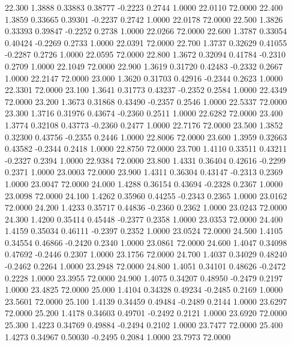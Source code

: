   22.300   1.3888   0.33883   0.38777  -0.2223   0.2744   1.0000  22.0110  72.0000
  22.400   1.3859   0.33665   0.39301  -0.2237   0.2742   1.0000  22.0178  72.0000
  22.500   1.3826   0.33393   0.39847  -0.2252   0.2738   1.0000  22.0266  72.0000
  22.600   1.3787   0.33054   0.40424  -0.2269   0.2733   1.0000  22.0391  72.0000
  22.700   1.3737   0.32629   0.41055  -0.2287   0.2726   1.0000  22.0595  72.0000
  22.800   1.3672   0.32094   0.41784  -0.2310   0.2709   1.0000  22.1049  72.0000
  22.900   1.3619   0.31720   0.42483  -0.2332   0.2667   1.0000  22.2147  72.0000
  23.000   1.3620   0.31703   0.42916  -0.2344   0.2623   1.0000  22.3301  72.0000
  23.100   1.3641   0.31773   0.43237  -0.2352   0.2584   1.0000  22.4349  72.0000
  23.200   1.3673   0.31868   0.43490  -0.2357   0.2546   1.0000  22.5337  72.0000
  23.300   1.3716   0.31976   0.43674  -0.2360   0.2511   1.0000  22.6282  72.0000
  23.400   1.3774   0.32108   0.43773  -0.2360   0.2477   1.0000  22.7176  72.0000
  23.500   1.3852   0.32300   0.43756  -0.2355   0.2446   1.0000  22.8006  72.0000
  23.600   1.3959   0.32663   0.43582  -0.2344   0.2418   1.0000  22.8750  72.0000
  23.700   1.4110   0.33511   0.43211  -0.2327   0.2394   1.0000  22.9384  72.0000
  23.800   1.4331   0.36404   0.42616  -0.2299   0.2371   1.0000  23.0003  72.0000
  23.900   1.4311   0.36304   0.43147  -0.2313   0.2369   1.0000  23.0047  72.0000
  24.000   1.4288   0.36154   0.43694  -0.2328   0.2367   1.0000  23.0098  72.0000
  24.100   1.4262   0.35960   0.44255  -0.2343   0.2365   1.0000  23.0162  72.0000
  24.200   1.4233   0.35717   0.44836  -0.2360   0.2362   1.0000  23.0243  72.0000
  24.300   1.4200   0.35414   0.45448  -0.2377   0.2358   1.0000  23.0353  72.0000
  24.400   1.4159   0.35034   0.46111  -0.2397   0.2352   1.0000  23.0524  72.0000
  24.500   1.4105   0.34554   0.46866  -0.2420   0.2340   1.0000  23.0861  72.0000
  24.600   1.4047   0.34098   0.47692  -0.2446   0.2307   1.0000  23.1756  72.0000
  24.700   1.4037   0.34029   0.48240  -0.2462   0.2264   1.0000  23.2948  72.0000
  24.800   1.4051   0.34101   0.48626  -0.2472   0.2228   1.0000  23.3955  72.0000
  24.900   1.4075   0.34207   0.48950  -0.2479   0.2197   1.0000  23.4825  72.0000
  25.000   1.4104   0.34328   0.49234  -0.2485   0.2169   1.0000  23.5601  72.0000
  25.100   1.4139   0.34459   0.49484  -0.2489   0.2144   1.0000  23.6297  72.0000
  25.200   1.4178   0.34603   0.49701  -0.2492   0.2121   1.0000  23.6920  72.0000
  25.300   1.4223   0.34769   0.49884  -0.2494   0.2102   1.0000  23.7477  72.0000
  25.400   1.4273   0.34967   0.50030  -0.2495   0.2084   1.0000  23.7973  72.0000
